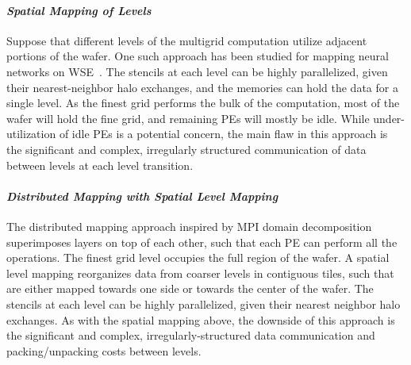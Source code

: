 \documentclass[conference]{IEEEtran}
\begin{document}
\paragraph{\textit{Spatial Mapping of Levels}} Suppose that different levels of the multigrid computation utilize adjacent portions of the wafer. 
            One such approach has been studied for mapping neural networks on WSE~\cite{cerebras_execution_modes,cerebras_pipeline_dl}.  %
            The stencils at each level can be highly parallelized, given their nearest-neighbor halo exchanges, and the memories can hold the data for a single level.  As the finest grid performs the bulk of the computation, most of the wafer will hold the fine grid, and remaining PEs will mostly be idle.  While under-utilization of idle PEs is a potential concern, the main flaw in this approach %
            is the significant and complex, irregularly structured communication of data between levels
            at each level transition.

            \paragraph{\textit{Distributed Mapping with Spatial Level Mapping}}
            The distributed mapping approach inspired by MPI domain decomposition superimposes layers on top of each other, such that each PE can perform all the operations.
            The finest grid level occupies the full region of the wafer.  A spatial level mapping reorganizes data from coarser levels in contiguous tiles, such that are either mapped towards one side or towards the center of the wafer. The stencils at each level can be highly parallelized, given their nearest neighbor halo exchanges.
            As with the spatial mapping above, the downside of this approach is the significant and complex, irregularly-structured data communication and packing/unpacking costs between levels.
\end{document}

